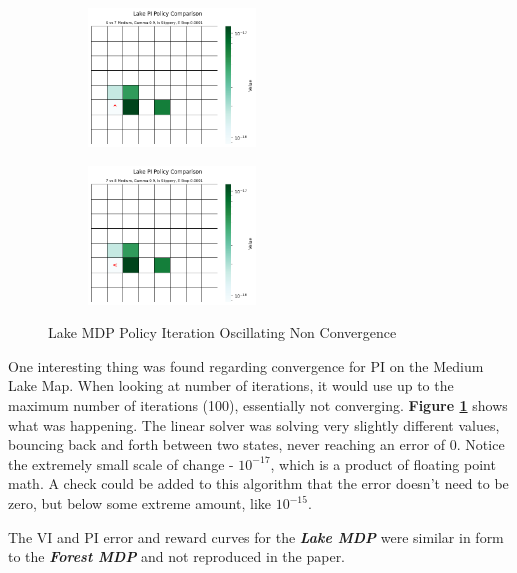 \documentclass[letterpaper]{article} %
\begin{document}
\begin{figure}[!htb]
	\begin{subfigure}[b]{0.25\textwidth}
		\centering
		\includegraphics[width=1.75in]{Figures/Lake_PI_Policy_Comparison_6_vs_7_Medium__Gamma_0_9__Is_Slippery__E_Stop_0_0001.png}
  	\end{subfigure}%
	\begin{subfigure}[b]{0.25\textwidth}
		\centering
		\includegraphics[width=1.75in]{Figures/Lake_PI_Policy_Comparison_7_vs_8_Medium__Gamma_0_9__Is_Slippery__E_Stop_0_0001.png}
  	\end{subfigure}%
\caption{Lake MDP Policy Iteration Oscillating Non Convergence}
\label{fig:lake_pi_oscillation}
\end{figure}

One interesting thing was found regarding convergence for PI on the Medium Lake Map.  When looking at number of iterations, it would use up to the maximum number of iterations (100), essentially not converging.  \textbf{Figure \ref{fig:lake_pi_oscillation}} shows what was happening.  The linear solver was solving very slightly different values, bouncing back and forth between two states, never reaching an error of 0.  Notice the extremely small scale of change - $10^{-17}$, which is a product of floating point math.  A check could be added to this algorithm that the error doesn't need to be zero, but below some extreme amount, like $10^{-15}$.

The VI and PI error and reward curves for  the \textbf{\emph{Lake MDP}} were similar in form to the \textbf{\emph{Forest MDP}} and not reproduced in the paper.
\end{document}
